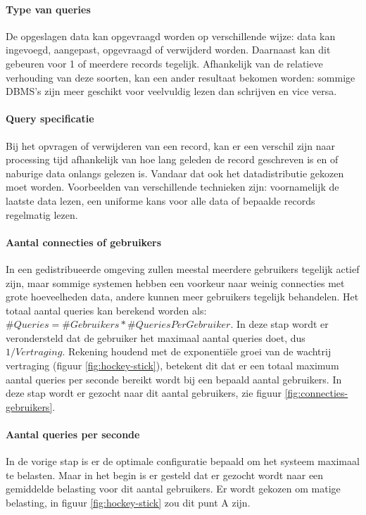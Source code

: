 \paragraph{Type van queries} De opgeslagen data kan opgevraagd worden op verschillende wijze: data kan ingevoegd, aangepast, opgevraagd of verwijderd worden. Daarnaast kan dit gebeuren voor 1 of meerdere records tegelijk. Afhankelijk van de relatieve verhouding van deze soorten, kan een ander resultaat bekomen worden: sommige DBMS's zijn meer geschikt voor veelvuldig lezen dan schrijven en vice versa. 

\paragraph{Query specificatie} Bij het opvragen of verwijderen van een record, kan er een verschil zijn naar processing tijd afhankelijk van hoe lang geleden de record geschreven is en of naburige data onlangs gelezen is. Vandaar dat ook het datadistributie gekozen moet worden. Voorbeelden van verschillende technieken zijn: voornamelijk de laatste data lezen, een uniforme kans voor alle data of bepaalde records regelmatig lezen.

\paragraph{Aantal connecties of gebruikers} In een gedistribueerde omgeving zullen meestal meerdere gebruikers tegelijk actief zijn, maar sommige systemen hebben een voorkeur naar weinig connecties met grote hoeveelheden data, andere kunnen meer gebruikers tegelijk behandelen. Het totaal aantal queries kan berekend worden als: $\#Queries = \#Gebruikers * \#QueriesPerGebruiker$. In deze stap wordt er verondersteld dat de gebruiker het maximaal aantal queries doet, dus $1/Vertraging$. Rekening houdend met de exponentiële groei van de wachtrij vertraging (figuur \ref{fig:hockey-stick}), betekent dit dat er een totaal maximum aantal queries per seconde bereikt wordt bij een bepaald aantal gebruikers. In deze stap wordt er gezocht naar dit aantal gebruikers, zie figuur \ref{fig:connecties-gebruikers}. 

\paragraph{Aantal queries per seconde} In de vorige stap is er de optimale configuratie bepaald om het systeem maximaal te belasten. Maar in het begin is er gesteld dat er gezocht wordt naar een gemiddelde belasting voor dit aantal gebruikers. Er wordt gekozen om matige belasting, in figuur \ref{fig:hockey-stick} zou dit punt A zijn. 

